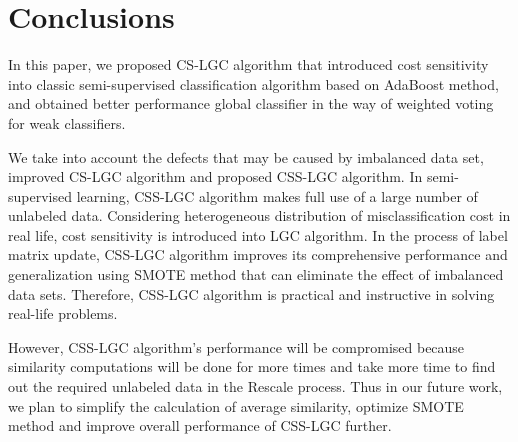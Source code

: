 \documentclass{svjour3}                     %
\begin{document}
\section{Conclusions}

In this paper, we proposed CS-LGC algorithm that introduced cost sensitivity into classic semi-supervised classification algorithm based on AdaBoost method, and obtained better performance
global classifier in the way of weighted voting for weak classifiers.

We take into account the defects that may be caused by imbalanced data set, improved CS-LGC
algorithm and proposed CSS-LGC algorithm. In semi-supervised learning, CSS-LGC algorithm makes full use of a large number of unlabeled data. Considering heterogeneous distribution of misclassification
cost in real life, cost sensitivity is introduced into LGC algorithm. In the process of label matrix update, CSS-LGC algorithm improves its comprehensive performance and generalization using SMOTE method that can eliminate the effect of imbalanced data sets. Therefore, CSS-LGC algorithm is practical and instructive in solving real-life problems.

However, CSS-LGC algorithm's performance will be compromised because similarity computations will be done for more times and take more time to find out the required unlabeled data in the Rescale process. Thus in our future work, we plan to simplify the calculation of average similarity, optimize SMOTE method and improve overall performance of CSS-LGC further.



\end{document}
